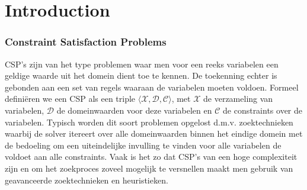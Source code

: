 \chapter{Introduction}
\label{cha:intro}

\subsection{Constraint Satisfaction Problems}
CSP's zijn van het type problemen waar men voor een reeks variabelen een geldige waarde uit het domein dient toe te kennen. De toekenning echter is gebonden aan een set van regels waaraan de variabelen moeten voldoen. Formeel defini\"{e}ren we een CSP als een triple $\langle \mathcal{X},\mathcal{D},\mathcal{C} \rangle$, met $\mathcal{X}$ de verzameling van variabelen, $\mathcal{D}$ de domeinwaarden voor deze variabelen en $\mathcal{C}$ de constraints over de variabelen. Typisch worden dit soort problemen opgelost d.m.v. zoektechnieken waarbij de solver itereert over alle domeinwaarden binnen het eindige domein met de bedoeling om een uiteindelijke invulling te vinden voor alle variabelen de voldoet aan alle constraints. Vaak is het zo dat CSP's van een hoge complexiteit zijn en om het zoekproces zoveel mogelijk te versnellen maakt men gebruik van geavanceerde zoektechnieken en heuristieken.  


